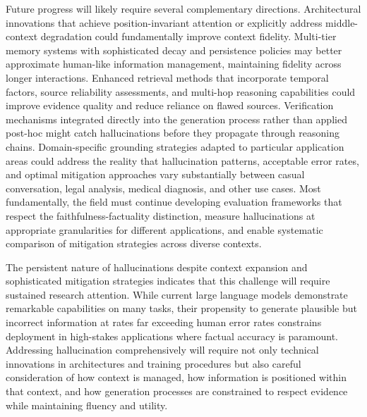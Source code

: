 Future progress will likely require several complementary directions. Architectural innovations that achieve position-invariant attention or explicitly address middle-context degradation could fundamentally improve context fidelity. Multi-tier memory systems with sophisticated decay and persistence policies may better approximate human-like information management, maintaining fidelity across longer interactions. Enhanced retrieval methods that incorporate temporal factors, source reliability assessments, and multi-hop reasoning capabilities could improve evidence quality and reduce reliance on flawed sources. Verification mechanisms integrated directly into the generation process rather than applied post-hoc might catch hallucinations before they propagate through reasoning chains. Domain-specific grounding strategies adapted to particular application areas could address the reality that hallucination patterns, acceptable error rates, and optimal mitigation approaches vary substantially between casual conversation, legal analysis, medical diagnosis, and other use cases. Most fundamentally, the field must continue developing evaluation frameworks that respect the faithfulness-factuality distinction, measure hallucinations at appropriate granularities for different applications, and enable systematic comparison of mitigation strategies across diverse contexts.

The persistent nature of hallucinations despite context expansion and sophisticated mitigation strategies indicates that this challenge will require sustained research attention. While current large language models demonstrate remarkable capabilities on many tasks, their propensity to generate plausible but incorrect information at rates far exceeding human error rates constrains deployment in high-stakes applications where factual accuracy is paramount. Addressing hallucination comprehensively will require not only technical innovations in architectures and training procedures but also careful consideration of how context is managed, how information is positioned within that context, and how generation processes are constrained to respect evidence while maintaining fluency and utility.
